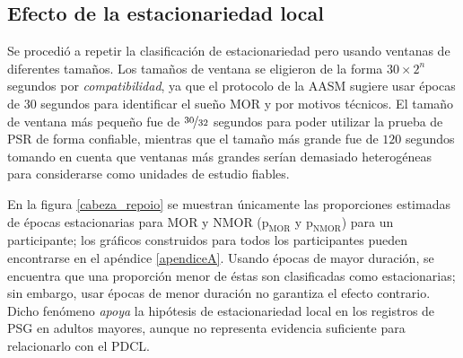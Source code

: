 \documentclass[12pt,letterpaper]{book}
\begin{document}

\subsection*{Efecto de la estacionariedad local}

Se procedió a repetir la clasificación de estacionariedad pero usando ventanas de diferentes tamaños.
%
Los tamaños de ventana se eligieron de la forma $30 \times 2^{n}$ segundos por \textit{compatibilidad}, ya que el protocolo de la AASM sugiere usar épocas de 30 segundos para identificar el sueño MOR y por motivos técnicos.
%
El tamaño de ventana más pequeño fue de $\nicefrac{30}{32}$ segundos para poder utilizar la prueba de PSR de forma confiable, mientras que el tamaño más grande fue de $120$ segundos tomando en cuenta que ventanas más grandes serían demasiado heterogéneas para considerarse como unidades de estudio fiables.

En la figura \ref{cabeza_repoio} se muestran únicamente las proporciones estimadas de épocas estacionarias para MOR y NMOR ($\text{p}_{\text{MOR}}$ y $\text{p}_{\text{NMOR}}$) para un participante; los gráficos construidos para todos los participantes pueden encontrarse en el apéndice \ref{apendiceA}.
%
Usando épocas de mayor duración, se encuentra que una proporción menor de éstas son clasificadas como estacionarias; sin embargo, usar épocas de menor duración no garantiza el efecto contrario.
%
Dicho fenómeno \textit{apoya} la hipótesis de estacionariedad local en los registros de PSG en adultos mayores, aunque no representa evidencia suficiente para relacionarlo con el PDCL.
\end{document}
